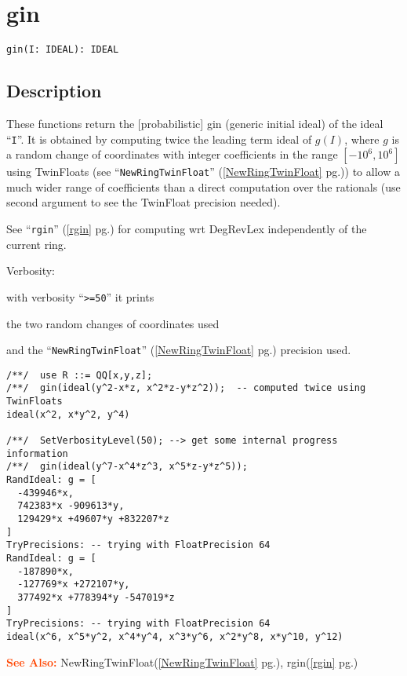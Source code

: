 \documentclass[a4paper]{mybook}
\newenvironment{command}{}{} %
\newcommand\SeeAlso{\par\textcolor{OrangeRed}{\textbf{\large See Also: }}}
\begin{document}
\section{gin}
\label{gin}
\begin{command} %


\begin{Verbatim}[label=syntax, rulecolor=\color{MidnightBlue},
frame=single]
gin(I: IDEAL): IDEAL
\end{Verbatim}


\subsection*{Description}

These functions return the [probabilistic] gin (generic initial ideal)
of the ideal ``\verb&I&''.
It is obtained by computing twice the leading term ideal of $g(I)$,
where $g$ is a random change of coordinates with
integer coefficients in the range $[-10^6, 10^6]$
using TwinFloats (see ``\verb&NewRingTwinFloat&'' (\ref{NewRingTwinFloat} pg.\pageref{NewRingTwinFloat})) to allow a much
wider range of coefficients than a direct computation over the
rationals (use second argument to see the TwinFloat precision needed).
\par 
See ``\verb&rgin&'' (\ref{rgin} pg.\pageref{rgin}) for computing wrt DegRevLex independently of
the current ring.
\par 
Verbosity:\par 
with verbosity ``\verb&>=50&'' it prints\par 
the two random changes of coordinates used\par 
and the ``\verb&NewRingTwinFloat&'' (\ref{NewRingTwinFloat} pg.\pageref{NewRingTwinFloat}) precision used. 
\begin{Verbatim}[label=example, rulecolor=\color{PineGreen}, frame=single]
/**/  use R ::= QQ[x,y,z];
/**/  gin(ideal(y^2-x*z, x^2*z-y*z^2));  -- computed twice using TwinFloats
ideal(x^2, x*y^2, y^4)

/**/  SetVerbosityLevel(50); --> get some internal progress information
/**/  gin(ideal(y^7-x^4*z^3, x^5*z-y*z^5));
RandIdeal: g = [
  -439946*x,
  742383*x -909613*y,
  129429*x +49607*y +832207*z
]
TryPrecisions: -- trying with FloatPrecision 64
RandIdeal: g = [
  -187890*x,
  -127769*x +272107*y,
  377492*x +778394*y -547019*z
]
TryPrecisions: -- trying with FloatPrecision 64
ideal(x^6, x^5*y^2, x^4*y^4, x^3*y^6, x^2*y^8, x*y^10, y^12)
\end{Verbatim}


\SeeAlso %
  NewRingTwinFloat(\ref{NewRingTwinFloat} pg.\pageref{NewRingTwinFloat}), 
    rgin(\ref{rgin} pg.\pageref{rgin})
\end{command} %
\end{document}
